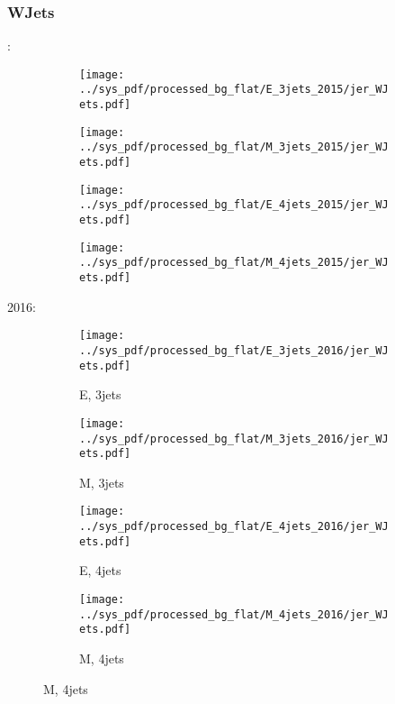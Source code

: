 \documentclass{beamer}
\begin{document}
\begin{frame}
\frametitle{WJets}
\fontsize{5}{1}:
\begin{figure}
\centering
\begin{subfigure}[b]{0.24\textwidth}
\texttt{[image: ../sys\_pdf/processed\_bg\_flat/E\_3jets\_2015/jer\_WJets.pdf]}
\end{subfigure}
\begin{subfigure}[b]{0.24\textwidth}
\texttt{[image: ../sys\_pdf/processed\_bg\_flat/M\_3jets\_2015/jer\_WJets.pdf]}
\end{subfigure}
\begin{subfigure}[b]{0.24\textwidth}
\texttt{[image: ../sys\_pdf/processed\_bg\_flat/E\_4jets\_2015/jer\_WJets.pdf]}
\end{subfigure}
\begin{subfigure}[b]{0.24\textwidth}
\texttt{[image: ../sys\_pdf/processed\_bg\_flat/M\_4jets\_2015/jer\_WJets.pdf]}
\end{subfigure}
\end{figure}
2016:
\begin{figure}
\centering
\begin{subfigure}[b]{0.24\textwidth}
\texttt{[image: ../sys\_pdf/processed\_bg\_flat/E\_3jets\_2016/jer\_WJets.pdf]}
\captionsetup{font=tiny}
\caption{E, 3jets}
\end{subfigure}
\begin{subfigure}[b]{0.24\textwidth}
\texttt{[image: ../sys\_pdf/processed\_bg\_flat/M\_3jets\_2016/jer\_WJets.pdf]}
\captionsetup{font=tiny}
\caption{M, 3jets}
\end{subfigure}
\begin{subfigure}[b]{0.24\textwidth}
\texttt{[image: ../sys\_pdf/processed\_bg\_flat/E\_4jets\_2016/jer\_WJets.pdf]}
\captionsetup{font=tiny}
\caption{E, 4jets}
\end{subfigure}
\begin{subfigure}[b]{0.24\textwidth}
\texttt{[image: ../sys\_pdf/processed\_bg\_flat/M\_4jets\_2016/jer\_WJets.pdf]}
\captionsetup{font=tiny}
\caption{M, 4jets}
\end{subfigure}
\end{figure}
\end{frame}
\end{document}
